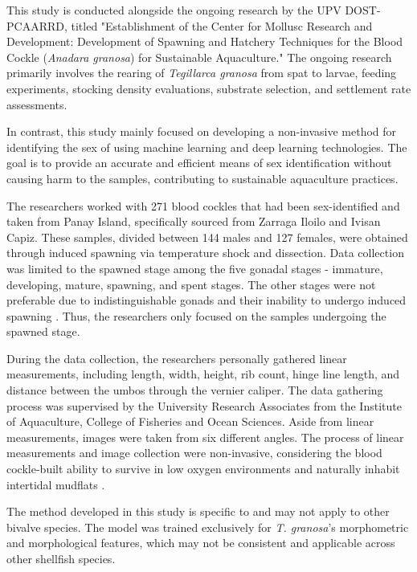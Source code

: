 This study is conducted alongside the ongoing research by the UPV DOST-PCAARRD, titled "Establishment of the Center for Mollusc Research and Development: Development of Spawning and Hatchery Techniques for the Blood Cockle (\textit{Anadara granosa}) for Sustainable Aquaculture." The ongoing research primarily involves the rearing of \textit{Tegillarca granosa} from spat to larvae, feeding experiments, stocking density evaluations, substrate selection, and settlement rate assessments.

In contrast, this study mainly focused on developing a non-invasive method for identifying the sex of \Tgranosa using machine learning and deep learning technologies. The goal is to provide an accurate and efficient means of sex identification without causing harm to the samples, contributing to sustainable aquaculture practices.

The researchers worked with 271  blood cockles that had been sex-identified and taken from Panay Island, specifically sourced from Zarraga Iloilo and Ivisan Capiz. These samples, divided between 144 males and 127 females, were obtained through induced spawning via temperature shock and dissection. Data collection was limited to the spawned stage among the five gonadal stages  - immature, developing, mature, spawning, and spent stages. The other stages were not preferable due to indistinguishable gonads and their inability to undergo induced spawning \cite{may2021}.  Thus, the researchers only focused on the samples undergoing the spawned stage. 

During the data collection,  the researchers personally gathered linear measurements, including length, width, height, rib count, hinge line length, and distance between the umbos through the vernier caliper. The data gathering process was supervised by the University Research Associates from the Institute of Aquaculture, College of Fisheries and Ocean Sciences. Aside from linear measurements, images were taken from six different angles. The process of linear measurements and image collection were non-invasive, considering the blood cockle-built ability to survive in low oxygen environments and naturally inhabit intertidal mudflats \cite{zhan2022}.

The method developed in this study is specific to \Tgranosa and may not apply to other bivalve species. The model was trained exclusively for \textit{T. granosa}'s morphometric and morphological features, which may not be consistent and applicable across other shellfish species. 

